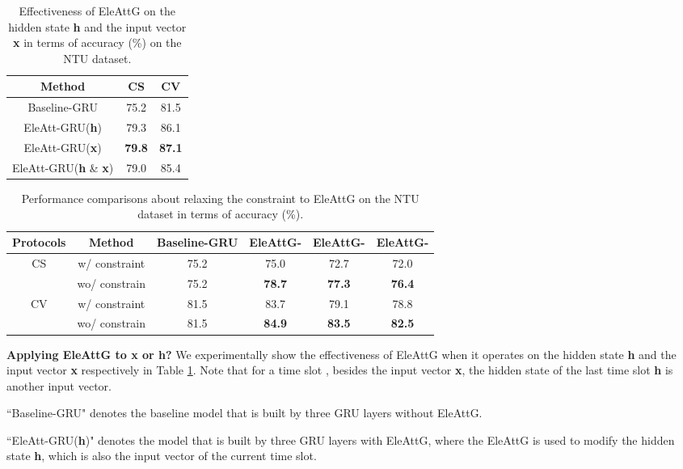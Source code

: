 \documentclass[journal]{IEEEtran}
\begin{document}
\begin{table}[!]
  \centering
  \caption{Effectiveness of EleAttG on the hidden state \textbf{h} and the input vector \textbf{x} in terms of accuracy (\%) on the NTU dataset.}
    \begin{tabular}{ccc}
    \toprule
    Method & CS    & CV \\
    \midrule
    Baseline-GRU & 75.2  & 81.5 \\
    EleAtt-GRU(\textbf{h}) & 79.3  & 86.1 \\
    EleAtt-GRU(\textbf{x}) & \textbf{79.8}  & \textbf{87.1} \\
    EleAtt-GRU(\textbf{h} \& \textbf{x}) & 79.0    & 85.4 \\
    \bottomrule
    \end{tabular}
  \label{tab:EleAttG}
\end{table}

\setlength{\tabcolsep}{4pt}
\begin{table*}[th]
	\centering
	\caption{Performance comparisons about relaxing the constraint to EleAttG on the NTU dataset in terms of accuracy (\%).}
	\label{tab:constrain}
	\begin{tabular}{cccccc}
		\toprule
		Protocols           & Method              & Baseline-GRU & EleAttG- & EleAttG- & EleAttG- \\
		\midrule
		\multirow{2}{*}{CS} &  w/ constraint  & 75.2          & 75.0      & 72.7      & 72.0      \\
		&  wo/ constrain & 75.2          & \bf{78.7}      & \bf{77.3}      & \bf{76.4}      \\
		\midrule
		\multirow{2}{*}{CV} &  w/ constraint  & 81.5          & 83.7      & 79.1      & 78.8      \\
		&  wo/ constrain & 81.5          & \bf{84.9}      & \bf{83.5}      & \bf{82.5}     \\
		\bottomrule
	\end{tabular}
\end{table*}
\textbf{Applying EleAttG to x or h?} We experimentally show the effectiveness of EleAttG when it operates on the hidden state \textbf{h} and the input vector \textbf{x} respectively in Table \ref{tab:EleAttG}. Note that for a time slot , besides the input vector \textbf{x}, the hidden state of the last time slot \textbf{h} is another input vector.

``Baseline-GRU" denotes the baseline model that is built by three GRU layers without EleAttG. 

``EleAtt-GRU(\textbf{h})" denotes the model that is built by three GRU layers with EleAttG, where the EleAttG is used to modify the hidden state \textbf{h}, which is also the input vector of the current time slot.
\end{document}
